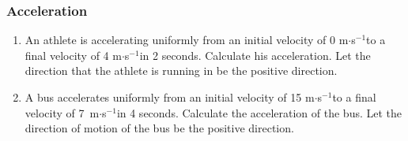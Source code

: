 \label{m38794*secfhsst!!!underscore!!!id1815}
            \subsubsection{  Acceleration }
            \nopagebreak
            
      \label{m38794*id62523}\begin{enumerate}[noitemsep, label=\textbf{\arabic*}. ] 
            \label{m38794*uid78}\item An athlete is accelerating uniformly from an initial velocity of 0 m\begin{math}\ensuremath{\cdot}\end{math}s\begin{math}{}^{-1}\end{math}to a final velocity of 4 m\begin{math}\ensuremath{\cdot}\end{math}s\begin{math}{}^{-1}\end{math}in 2 seconds. Calculate his acceleration. Let the direction that the athlete is running in be the positive direction.\newline
            
\label{m38794*uid79}\item A bus accelerates uniformly from an initial velocity of 15 m\begin{math}\ensuremath{\cdot}\end{math}s\begin{math}{}^{-1}\end{math}to a final velocity of 7~m\begin{math}\ensuremath{\cdot}\end{math}s\begin{math}{}^{-1}\end{math}in 4 seconds. Calculate the acceleration of the bus. Let the direction of motion of the bus be the positive direction.\newline
            

\end{enumerate}
